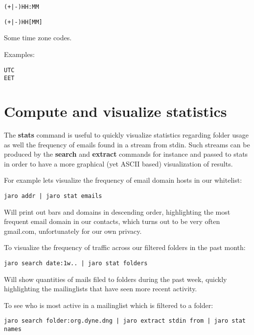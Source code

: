 \documentclass[a4,onecolumn,portrait]{article}
\begin{document}
\begin{verbatim}
(+|-)HH:MM
\end{verbatim}

\begin{verbatim}
(+|-)HH[MM]
\end{verbatim}

Some time zone codes.

Examples:

\begin{verbatim}
UTC
EET
\end{verbatim}

\section{Compute and visualize statistics}
\label{sec-8}

The \textbf{stats} command is useful to quickly visualize statistics regarding folder usage as well the frequency of emails found in a stream from stdin. Such streams can be produced by the \textbf{search} and \textbf{extract} commands for instance and passed to stats in order to have a more graphical (yet ASCII based) visualization of results.

For example lets visualize the frequency of email domain hosts in our whitelist:

\begin{verbatim}
jaro addr | jaro stat emails
\end{verbatim}

Will print out bars and domains in descending order, highlighting the most frequent email domain in our contacts, which turns out to be very often gmail.com, unfortunately for our own privacy.

To visualize the frequency of traffic across our filtered folders in the past month:

\begin{verbatim}
jaro search date:1w.. | jaro stat folders
\end{verbatim}

Will show quantities of mails filed to folders during the past week, quickly highlighting the mailinglists that have seen more recent activity.

To see who is most active in a mailinglist which is filtered to a folder:

\begin{verbatim}
jaro search folder:org.dyne.dng | jaro extract stdin from | jaro stat names
\end{verbatim}
\end{document}
